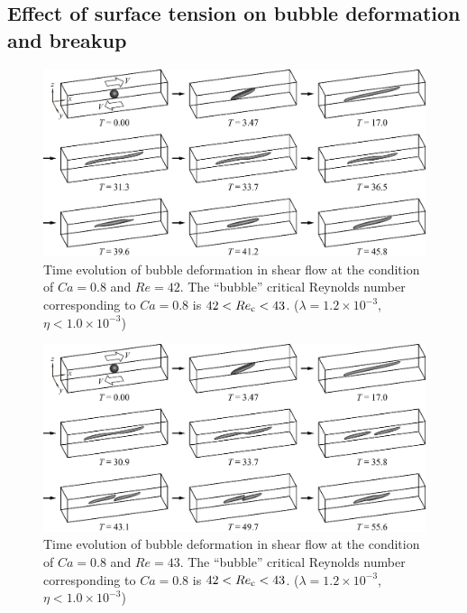 \documentclass{elsarticle}
\begin{document}
\subsection{Effect of surface tension on bubble deformation and breakup}
%
\begin{figure}%
  \centering
  \includegraphics[width=\textwidth]{Figure/10-BubbleDeformCa0p8Re42}
  \caption{Time evolution of bubble deformation in shear flow at the 
           condition of $Ca=0.8$ and $Re=42$.
	   The ``bubble'' 
	   critical Reynolds number corresponding to $Ca=0.8$ is
	   $42<Re_{\rm c}<43$.
           ($\lambda = 1.2 \times 10^{-3}$, $\eta < 1.0 \times 10^{-3}$) 
	   }
  \label{fig:BubDefCa0p8Re42}
\end{figure}
%
\begin{figure}%
  \centering
  \includegraphics[width=\textwidth]{Figure/11-BubbleBreakCa0p8Re43}
  \caption{Time evolution of bubble deformation in shear flow at the 
           condition of $Ca=0.8$ and $Re=43$.
	   The ``bubble'' 
	   critical Reynolds number corresponding to $Ca=0.8$ is
	   $42<Re_{\rm c}<43$.
           ($\lambda = 1.2 \times 10^{-3}$, $\eta < 1.0 \times 10^{-3}$) 
	   }
  \label{fig:BubBrkCa0p8Re43}
\end{figure}
\end{document}
